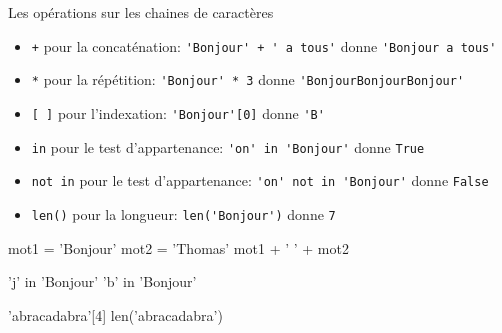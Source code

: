 \begin{easybox}{Les opérations sur les chaines de caractères}{}   
    \smallskip
    \begin{itemize}
        \item[] \texttt{+} \quad pour la concaténation:  \verb~'Bonjour' + ' a tous'~ donne \verb~'Bonjour a tous'~
        \item[] \texttt{*} \quad pour la répétition:  \verb~'Bonjour' * 3~ donne \verb~'BonjourBonjourBonjour'~
        \item[] \texttt{[ ]} \quad pour l'indexation:  \verb~'Bonjour'[0]~ donne \verb~'B'~
        \item[] \texttt{in} \quad pour le test d'appartenance:  \verb~'on' in 'Bonjour'~ donne \verb~True~
        \item[] \texttt{not in} \quad pour le test d'appartenance:  \verb~'on' not in 'Bonjour'~ donne \verb~False~
        \item[] \texttt{len()} \quad pour la longueur:  \verb~len('Bonjour')~ donne \verb~7~
       
    \end{itemize}
\end{easybox}


\begin{minipage}[t]{0.32\linewidth}
    \begin{ConsolePythontex}[ Label=false]{}
        mot1 = 'Bonjour'
        mot2 = 'Thomas'
        mot1 + ' ' + mot2
    \end{ConsolePythontex}
\end{minipage}\hfill
\begin{minipage}[t]{0.32\linewidth}
    \begin{ConsolePythontex}[ Label=false]{}
        'j' in 'Bonjour'
        'b' in 'Bonjour'
    \end{ConsolePythontex}
\end{minipage}\hfill{}
\begin{minipage}[t]{0.32\linewidth}
    \begin{ConsolePythontex}[ Label=false]{}
        'abracadabra'[4]
        len('abracadabra')
    \end{ConsolePythontex}
\end{minipage}

